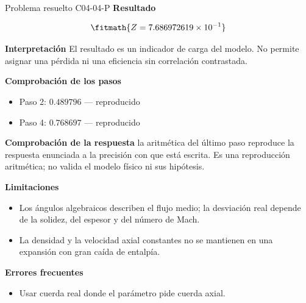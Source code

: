\documentclass[10pt,openany]{book}
\begin{document}
\begin{studiumworked}{Problema resuelto C04-04-P}
\noindent\textbf{Resultado}

\[
\fitmath{Z=7.686972619\times10^{-1}}
\]

\noindent\textbf{Interpretación}
El resultado es un indicador de carga del modelo. No permite asignar una pérdida ni una eficiencia sin correlación contrastada.

\noindent\textbf{Comprobación de los pasos}
\begin{itemize}
\item Paso 2: $0.489796$ — reproducido
\item Paso 4: $0.768697$ — reproducido
\end{itemize}

\noindent\textbf{Comprobación de la respuesta} la aritmética del último paso reproduce la respuesta enunciada a la precisión con que está escrita. Es una reproducción aritmética; no valida el modelo físico ni sus hipótesis.

\noindent\textbf{Limitaciones}
\begin{itemize}
\item Los ángulos algebraicos describen el flujo medio; la desviación real depende de la solidez, del espesor y del número de Mach.
\item La densidad y la velocidad axial constantes no se mantienen en una expansión con gran caída de entalpía.
\end{itemize}

\noindent\textbf{Errores frecuentes}
\begin{itemize}
\item Usar cuerda real donde el parámetro pide cuerda axial.
\end{itemize}
\end{studiumworked}
\end{document}
